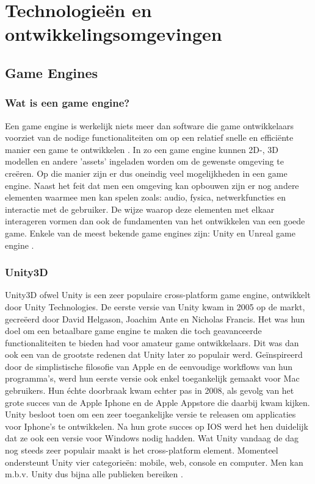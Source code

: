 \section{Technologieën en ontwikkelingsomgevingen}
\subsection{Game Engines}
\subsubsection{Wat is een game engine?}

Een game engine is werkelijk niets meer dan software die game ontwikkelaars voorziet van de nodige functionaliteiten om op een relatief snelle en efficiënte manier een game te ontwikkelen \autocite{Oculus2017}. In zo een game engine kunnen 2D-, 3D modellen en andere 'assets' ingeladen worden om de gewenste omgeving te creëren. Op die manier zijn er dus oneindig veel mogelijkheden in een game engine. Naast het feit dat men een omgeving kan opbouwen zijn er nog andere elementen waarmee men kan spelen zoals: audio, fysica, netwerkfuncties en interactie met de gebruiker. De wijze  waarop deze elementen met elkaar interageren vormen dan ook de fundamenten van het ontwikkelen van een goede game. Enkele van de meest bekende game engines zijn: Unity en Unreal game engine \autocite{Staff2018}.


\subsubsection{Unity3D}

Unity3D ofwel Unity is een zeer populaire cross-platform game engine, ontwikkelt door Unity Technologies.
De eerste versie van Unity kwam in 2005 op de markt, gecreëerd door David Helgason, Joachim Ante en Nicholas Francis. Het was hun doel om een betaalbare game engine te maken die toch geavanceerde functionaliteiten te bieden had voor amateur game ontwikkelaars. Dit was dan ook een van de grootste redenen dat Unity later zo populair werd. Geïnspireerd door de simplistische filosofie van Apple en de eenvoudige workflows van hun programma's, werd hun eerste versie ook enkel toegankelijk gemaakt voor Mac gebruikers. Hun échte doorbraak kwam echter pas in 2008, als gevolg van het grote succes van de Apple Iphone en de Apple Appstore die daarbij kwam kijken. Unity besloot toen om een zeer toegankelijke versie te releasen om applicaties voor Iphone's te ontwikkelen. Na hun grote succes op IOS werd het hen duidelijk dat ze ook een versie voor Windows nodig hadden. Wat Unity vandaag de dag nog steeds zeer populair maakt is het cross-platform element. Momenteel ondersteunt Unity vier categorieën: mobile, web, console en computer. Men kan m.b.v. Unity dus bijna alle publieken bereiken \autocite{Haas2014}.

